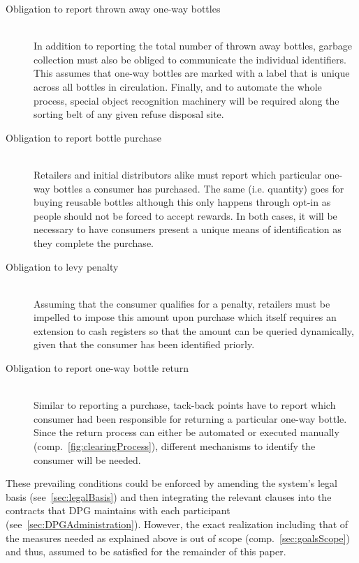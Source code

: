 \begin{description}
	\item[Obligation to report thrown away one-way bottles]
	\hfill \\
	In addition to reporting the total number of thrown away bottles\hide{(\ref{itm:reportNumber})}, garbage collection must also be obliged to communicate the individual identifiers\hide{(\ref{itm:reportIdentifier})}. This assumes that one-way bottles are marked with a label that is unique across all bottles in circulation. Finally, and to automate the whole process, special object recognition machinery will be required along the sorting belt of any given refuse disposal site.
	\item[Obligation to report bottle purchase]
	\hfill \\
	Retailers and initial distributors alike must report which particular one-way bottles a consumer has purchased\hide{(\ref{itm:reportOneWays})}. The same (i.e. quantity) goes for buying reusable bottles \hide{(\ref{itm:reportReusableNumber})} although this only happens through opt-in as people should not be forced to accept rewards. In both cases, it will be necessary to have consumers present a unique means of identification as they complete the purchase.
	\item[Obligation to levy penalty]
	\hfill \\
	Assuming that the consumer qualifies for a penalty, retailers must be impelled to impose this amount upon purchase which itself requires an extension to cash registers so that the amount can be queried dynamically\hide{(\ref{itm:lookUpPenalty})}, given that the consumer has been identified priorly.
	\item[Obligation to report one-way bottle return]
	\hfill \\
	Similar to reporting a purchase, tack-back points have to report which consumer had been responsible for returning a particular one-way bottle\hide{(\ref{itm:reportOneWayReturn})}. Since the return process can either be automated or executed manually (comp.~\autoref{fig:clearingProcess}), different mechanisms to identify the consumer will be needed.  
\end{description}

These prevailing conditions could be enforced by amending the system's legal basis (see~\ref{sec:legalBasis}) and then integrating the relevant clauses into the contracts that \ac{DPG} maintains with each participant (see~\ref{sec:DPGAdministration}). However, the exact realization including that of the measures needed as explained above is out of scope (comp.~\ref{sec:goalsScope}) and thus, assumed to be satisfied for the remainder of this paper. 

